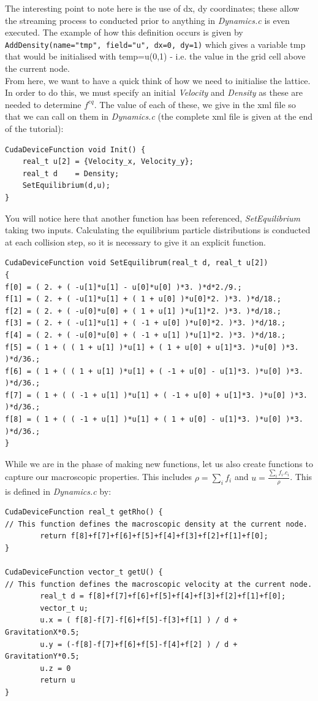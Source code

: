 \documentclass[12pt,a4paper]{report}
\begin{document}
The interesting point to note here is the use of dx, dy coordinates; these allow the streaming process to conducted prior to anything in \textit{Dynamics.c} is even executed. The example of how this definition occurs is given by \lstinline$AddDensity(name="tmp", field="u", dx=0, dy=1)$ which gives a variable tmp that would be initialised with temp=u(0,1) - i.e. the value in the grid cell above the current node.\\

From here, we want to have a quick think of how we need to initialise the lattice. In order to do this, we must specify an initial \textit{Velocity} and \textit{Density} as these are needed to determine $f^{eq}$. The value of each of these, we give in the xml file so that we can call on them in \textit{Dynamics.c} (the complete xml file is given at the end of the tutorial):
\begin{lstlisting}
CudaDeviceFunction void Init() {
	real_t u[2] = {Velocity_x, Velocity_y};
	real_t d    = Density;
	SetEquilibrium(d,u);
}
\end{lstlisting} 

You will notice here that another function has been referenced, \textit{SetEquilibrium} taking two inputs. Calculating the equilibrium particle distributions is conducted at each collision step, so it is necessary to give it an explicit function.
\begin{lstlisting}
CudaDeviceFunction void SetEquilibrum(real_t d, real_t u[2])
{
f[0] = ( 2. + ( -u[1]*u[1] - u[0]*u[0] )*3. )*d*2./9.;
f[1] = ( 2. + ( -u[1]*u[1] + ( 1 + u[0] )*u[0]*2. )*3. )*d/18.;
f[2] = ( 2. + ( -u[0]*u[0] + ( 1 + u[1] )*u[1]*2. )*3. )*d/18.;
f[3] = ( 2. + ( -u[1]*u[1] + ( -1 + u[0] )*u[0]*2. )*3. )*d/18.;
f[4] = ( 2. + ( -u[0]*u[0] + ( -1 + u[1] )*u[1]*2. )*3. )*d/18.;
f[5] = ( 1 + ( ( 1 + u[1] )*u[1] + ( 1 + u[0] + u[1]*3. )*u[0] )*3. )*d/36.;
f[6] = ( 1 + ( ( 1 + u[1] )*u[1] + ( -1 + u[0] - u[1]*3. )*u[0] )*3. )*d/36.;
f[7] = ( 1 + ( ( -1 + u[1] )*u[1] + ( -1 + u[0] + u[1]*3. )*u[0] )*3. )*d/36.;
f[8] = ( 1 + ( ( -1 + u[1] )*u[1] + ( 1 + u[0] - u[1]*3. )*u[0] )*3. )*d/36.;
}
\end{lstlisting} 

While we are in the phase of making new functions, let us also create functions to capture our macroscopic properties. This includes $\rho = \sum_i f_i$ and $u = \frac{\sum_i f_i.c_i}{\rho}$. This is defined in \textit{Dynamics.c} by:
\begin{lstlisting}
CudaDeviceFunction real_t getRho() {
// This function defines the macroscopic density at the current node.
        return f[8]+f[7]+f[6]+f[5]+f[4]+f[3]+f[2]+f[1]+f[0];
}

CudaDeviceFunction vector_t getU() {
// This function defines the macroscopic velocity at the current node.
        real_t d = f[8]+f[7]+f[6]+f[5]+f[4]+f[3]+f[2]+f[1]+f[0];
        vector_t u;
        u.x = ( f[8]-f[7]-f[6]+f[5]-f[3]+f[1] ) / d + GravitationX*0.5;
        u.y = (-f[8]-f[7]+f[6]+f[5]-f[4]+f[2] ) / d + GravitationY*0.5;
        u.z = 0
        return u
}
\end{lstlisting} 
\end{document}
